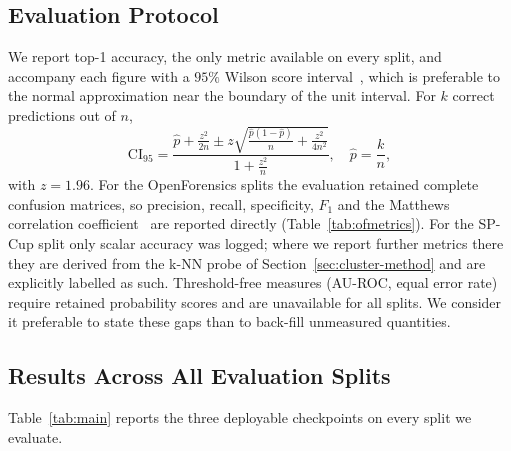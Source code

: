 \documentclass[10pt,journal]{IEEEtran}
\begin{document}
\subsection{Evaluation Protocol}
We report top-1 accuracy, the only metric available on every split, and
accompany each figure with a $95\%$ Wilson score
interval~\cite{wilson1927interval}, which is preferable to the normal
approximation near the boundary of the unit interval. For $k$ correct
predictions out of $n$,
\begin{equation}
\mathrm{CI}_{95}=
\frac{\hat{p}+\frac{z^2}{2n}\pm z\sqrt{\frac{\hat{p}(1-\hat{p})}{n}
      +\frac{z^2}{4n^2}}}{1+\frac{z^2}{n}},\quad \hat p=\frac{k}{n},
\end{equation}
with $z=1.96$. For the OpenForensics splits the evaluation retained complete
confusion matrices, so precision, recall, specificity, $F_1$ and the Matthews
correlation coefficient~\cite{matthews1975mcc} are reported directly
(Table~\ref{tab:ofmetrics}). For the SP-Cup split only scalar accuracy was
logged; where we report further metrics there they are derived from the k-NN
probe of Section~\ref{sec:cluster-method} and are explicitly labelled as such.
Threshold-free measures (AU-ROC, equal error rate) require retained
probability scores and are unavailable for all splits. We consider it
preferable to state these gaps than to back-fill unmeasured quantities.

\subsection{Results Across All Evaluation Splits}
Table~\ref{tab:main} reports the three deployable checkpoints on every split
we evaluate.
\end{document}
